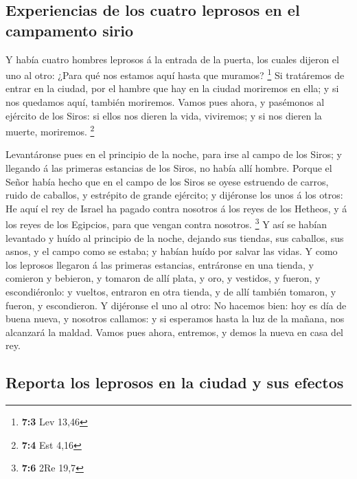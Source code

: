 \hypertarget{experiencias-de-los-cuatro-leprosos-en-el-campamento-sirio}{%
\subsection{Experiencias de los cuatro leprosos en el campamento
sirio}\label{experiencias-de-los-cuatro-leprosos-en-el-campamento-sirio}}

 Y había cuatro hombres leprosos á la entrada de la puerta,
los cuales dijeron el uno al otro: ¿Para qué nos estamos aquí hasta que
muramos? \footnote{\textbf{7:3} Lev 13,46}  Si tratáremos de
entrar en la ciudad, por el hambre que hay en la ciudad moriremos en
ella; y si nos quedamos aquí, también moriremos. Vamos pues ahora, y
pasémonos al ejército de los Siros: si ellos nos dieren la vida,
viviremos; y si nos dieren la muerte, moriremos. \footnote{\textbf{7:4}
  Est 4,16}

 Levantáronse pues en el principio de la noche, para irse al
campo de los Siros; y llegando á las primeras estancias de los Siros, no
había allí hombre.  Porque el Señor había hecho que en el
campo de los Siros se oyese estruendo de carros, ruido de caballos, y
estrépito de grande ejército; y dijéronse los unos á los otros: He aquí
el rey de Israel ha pagado contra nosotros á los reyes de los Hetheos, y
á los reyes de los Egipcios, para que vengan contra nosotros.
\footnote{\textbf{7:6} 2Re 19,7}  Y así se habían levantado
y huído al principio de la noche, dejando sus tiendas, sus caballos, sus
asnos, y el campo como se estaba; y habían huído por salvar las vidas.
 Y como los leprosos llegaron á las primeras estancias,
entráronse en una tienda, y comieron y bebieron, y tomaron de allí
plata, y oro, y vestidos, y fueron, y escondiéronlo: y vueltos, entraron
en otra tienda, y de allí también tomaron, y fueron, y escondieron.
 Y dijéronse el uno al otro: No hacemos bien: hoy es día de
buena nueva, y nosotros callamos: y si esperamos hasta la luz de la
mañana, nos alcanzará la maldad. Vamos pues ahora, entremos, y demos la
nueva en casa del rey.

\hypertarget{reporta-los-leprosos-en-la-ciudad-y-sus-efectos}{%
\subsection{Reporta los leprosos en la ciudad y sus
efectos}\label{reporta-los-leprosos-en-la-ciudad-y-sus-efectos}}

